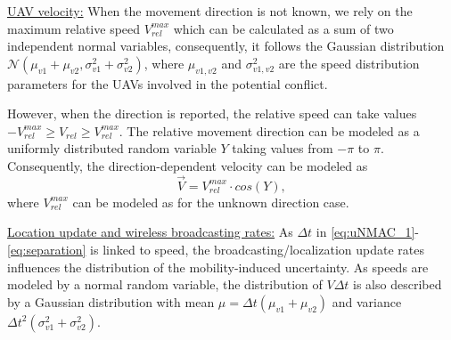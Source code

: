 \documentclass[10pt,conference]{IEEEtran}
\begin{document}
\underline{UAV velocity:} When the movement direction is not known, we rely on the maximum relative speed $V_{rel}^{max}$ which can be calculated as a sum of two independent normal variables, consequently, it follows the Gaussian distribution $\mathcal{N}(\mu_{v1}+\mu_{v2},\sigma^2_{v1}+\sigma^2_{v2})$, where $\mu_{v1, v2}$ and $\sigma^2_{v1,v2}$ are the speed distribution parameters for the UAVs involved in the potential conflict.

However, when the direction is reported, %
the relative speed can take values $-V_{rel}^{max}\geq V_{rel}\geq V_{rel}^{max}$. The relative movement direction can be modeled as a uniformly distributed random variable $Y$ taking values from $-\pi$ to $\pi$. Consequently, the direction-dependent velocity can be modeled as
\begin{equation}
    \vec{V}= V_{rel}^{max} \cdot cos(Y),
\end{equation}
where $V_{rel}^{max}$ can be modeled as for the unknown direction case. 

\underline{Location update and wireless broadcasting rates:}
As $\Delta t$ in \eqref{eq:uNMAC_1}-\eqref{eq:separation} is linked to speed, the broadcasting/localization update rates influences the distribution of the mobility-induced uncertainty. As speeds are modeled by a normal random variable, the distribution of $V \Delta t$ is also described by a Gaussian distribution with mean $\mu=\Delta t (\mu_{v1}+\mu_{v2})$ and variance $\Delta t^2 (\sigma_{v1}^2+\sigma^2_{v2})$.
\end{document}
